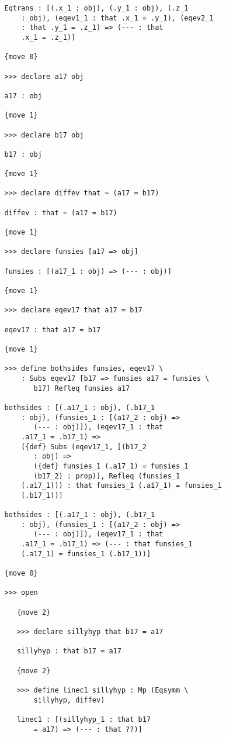 \documentclass[12pt]{article}
\begin{document}
\begin{verbatim}
   Eqtrans : [(.x_1 : obj), (.y_1 : obj), (.z_1 
       : obj), (eqev1_1 : that .x_1 = .y_1), (eqev2_1 
       : that .y_1 = .z_1) => (--- : that 
       .x_1 = .z_1)]

   {move 0}

   >>> declare a17 obj

   a17 : obj

   {move 1}

   >>> declare b17 obj

   b17 : obj

   {move 1}

   >>> declare diffev that ~ (a17 = b17)

   diffev : that ~ (a17 = b17)

   {move 1}

   >>> declare funsies [a17 => obj]

   funsies : [(a17_1 : obj) => (--- : obj)]

   {move 1}

   >>> declare eqev17 that a17 = b17

   eqev17 : that a17 = b17

   {move 1}

   >>> define bothsides funsies, eqev17 \
       : Subs eqev17 [b17 => funsies a17 = funsies \
          b17] Refleq funsies a17

   bothsides : [(.a17_1 : obj), (.b17_1 
       : obj), (funsies_1 : [(a17_2 : obj) => 
          (--- : obj)]), (eqev17_1 : that 
       .a17_1 = .b17_1) => 
       ({def} Subs (eqev17_1, [(b17_2 
          : obj) => 
          ({def} funsies_1 (.a17_1) = funsies_1 
          (b17_2) : prop)], Refleq (funsies_1 
       (.a17_1))) : that funsies_1 (.a17_1) = funsies_1 
       (.b17_1))]

   bothsides : [(.a17_1 : obj), (.b17_1 
       : obj), (funsies_1 : [(a17_2 : obj) => 
          (--- : obj)]), (eqev17_1 : that 
       .a17_1 = .b17_1) => (--- : that funsies_1 
       (.a17_1) = funsies_1 (.b17_1))]

   {move 0}

   >>> open

      {move 2}

      >>> declare sillyhyp that b17 = a17

      sillyhyp : that b17 = a17

      {move 2}

      >>> define linec1 sillyhyp : Mp (Eqsymm \
          sillyhyp, diffev)

      linec1 : [(sillyhyp_1 : that b17 
          = a17) => (--- : that ??)]


\end{verbatim}
\end{document}
